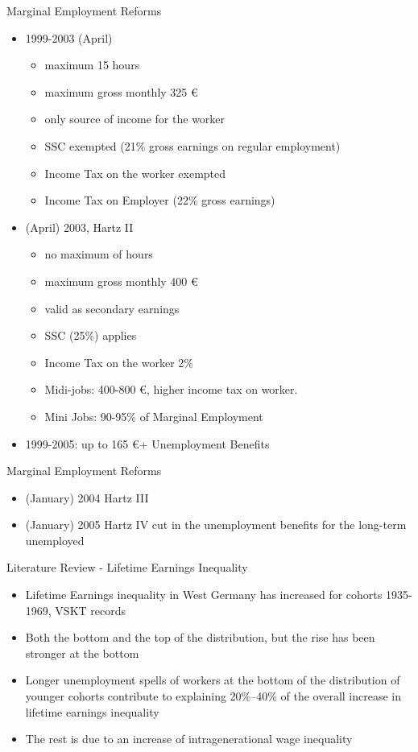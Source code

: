 \documentclass{beamer}
\let\oldcite=\cite
\renewcommand{\cite}[1]{\textcolor[rgb]{.0,.2,.7}{\oldcite{#1}}}
\begin{document}
\begin{frame}{Marginal Employment Reforms}
\begin{itemize}
\setlength{\itemsep}{0.5 cm}
\item 1999-2003 (April)
\begin{itemize}
\item maximum 15 hours
\item maximum gross monthly 325 \euro
\item only source of income for the worker
\item SSC exempted (21\% gross earnings on regular employment)
\item Income Tax on the worker exempted 
\item Income Tax on Employer (22\% gross earnings) 
\end{itemize}
\item (April) 2003, Hartz II
\begin{itemize}
\item no maximum of hours
\item maximum gross monthly 400 \euro
\item valid as secondary earnings 
\item SSC (25\%) applies
\item Income Tax on the worker 2\%
\item Midi-jobs: 400-800 \euro, higher income tax on worker.
\item Mini Jobs: 90-95\% of Marginal Employment
\end{itemize}
\item 1999-2005: up to 165 \euro + Unemployment Benefits
\end{itemize}
\end{frame}

\begin{frame}{Marginal Employment Reforms}
\begin{itemize}
\setlength{\itemsep}{0.5 cm}
\item (January) 2004 Hartz III
\item (January) 2005 Hartz IV cut in the unemployment benefits for the long-term unemployed
\end{itemize}
\end{frame}

\begin{frame}{Literature Review - Lifetime Earnings Inequality}
\cite{BoCo15}
\begin{itemize}
\setlength{\itemsep}{0.5 cm}
\item Lifetime Earnings inequality in West Germany has increased for cohorts 1935-1969, VSKT records
\item Both the bottom and the top of the distribution, but the rise has been
stronger at the bottom
\item Longer unemployment spells of workers at the bottom of the
distribution of younger cohorts contribute to explaining 20\%–40\%
of the overall increase in lifetime earnings inequality
\item The rest is due to an increase of intragenerational wage inequality
\end{itemize}
\end{frame}
\end{document}

